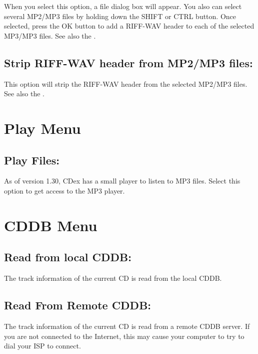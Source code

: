 When you select this option, a file dialog box will appear. You also can select
several MP2/MP3 files by holding down the SHIFT or CTRL button. Once selected,
press the OK button to add a RIFF-WAV header to each of the selected MP3/MP3 files.
See also the .


\subsection{Strip RIFF-WAV header from MP2/MP3 files:}

This option will strip the RIFF-WAV header from the selected MP2/MP3 files.
See also the .


\section{Play Menu}
\subsection{Play Files:}

As of version 1.30, CDex has a small player to listen to MP3 files. Select this
option to get access to the MP3 player.


\section{CDDB Menu}

\subsection{Read from local CDDB:}

The track information of the current CD is read from the local CDDB.


\subsection{Read From Remote CDDB:}

The track information of the current CD is read from a remote CDDB server. If
you are not connected to the Internet, this may cause your computer to try to dial your ISP to connect.


